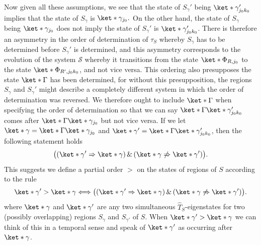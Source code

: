\documentclass[12pt]{report}
\providecommand{\DIFaddbegin}{} %
\providecommand{\DIFaddend}{} %
\providecommand{\DIFdelbegin}{} %
\providecommand{\DIFdelend}{} %
\begin{document}
Now given all these assumptions, we see that the state of $S_{\gamma}'$ being $\ket*{\gamma_{j_0k_0}'}$ implies that the state of $S_{\gamma}$ is $\ket*{\gamma_{j_0}}.$ On the other hand, the state of $S_{\gamma}$ being $\ket*{\gamma_{j_0}}$ does not imply the state of $S_{\gamma}'$ is $\ket*{\gamma_{j_0k_0}'}$. There is therefore an asymmetry in the order of determination of $\tau_S$ whereby $S_{\gamma}$ has to be determined before $S_{\gamma}'$ is determined, and this asymmetry corresponds to the evolution of the system $\mathcal{S}$ whereby it transitions from the state $\ket*{\Phi_{R,j_0}}$ to the state $\ket*{\Phi_{R',j_0k_0}}$, and not vice versa. This ordering also presupposes the state $\ket*{\Gamma}$ has been determined, for without this presupposition, the regions  $S_{\gamma}$ and $S_{\gamma}'$ might describe a completely different system in which the order of determination was reversed. We therefore ought to include $\ket*{\Gamma}$ when specifying the order of determination so that we can say $\ket*{\Gamma}\ket*{\gamma_{j_0k_0}'}$ comes after $\ket*{\Gamma}\ket*{\gamma_{j_0}}$ but not vice versa. If we let $\ket*{\gamma}=\ket*{\Gamma}\ket*{\gamma_{j_0}}$ and $\ket*{\gamma'}=\ket*{\Gamma}\ket*{\gamma_{j_0k_0}'}$, then the following statement holds
$$\big((\ket*{\gamma'}\Rightarrow\ket*{\gamma})\,\& \,(\ket*{\gamma}\not\Rightarrow\ket*{\gamma'})\big).$$
This suggests we define a partial order $>$ 
on the states of regions of $S$ according to the rule
\begin{equation}\label{timeordering}
\ket*{\gamma'} > \ket*{\gamma}
\Longleftrightarrow 
\big((\ket*{\gamma'}\Rightarrow\ket*{\gamma})\,\& \,(\ket*{\gamma}\not\Rightarrow\ket*{\gamma'})\big).
\end{equation}%
\DIFdelbegin %
\DIFdelend \DIFaddbegin {}\DIFaddend %
where $\ket*{\gamma}$ and $\ket*{\gamma'}$ are any two simultaneous $\hat{T}_S$-eigenstates for two (possibly overlapping) regions $S_\gamma$ and $S_{\gamma'}$ of $S$. When $\ket*{\gamma'} > \ket*{\gamma}$ we can think of this in a temporal sense and speak of $\ket*{\gamma'}$ as occurring after $\ket*{\gamma}$.
\end{document}
